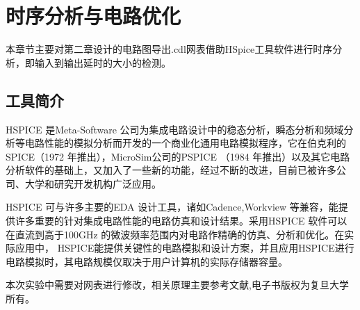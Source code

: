 \chapter{时序分析与电路优化}
本章节主要对第二章设计的电路图导出.cdl网表借助HSpice工具软件进行时序分析，即输入到输出延时的大小的检测。
\section{工具简介}
HSPICE 是Meta-Software 公司为集成电路设计中的稳态分析，瞬态分析和频域分析等电路性能的模拟分析而开发的一个商业化通用电路模拟程序，它在伯克利的SPICE（1972 年推出），MicroSim公司的PSPICE （1984 年推出）以及其它电路分析软件的基础上，又加入了一些新的功能，经过不断的改进，目前已被许多公司、大学和研究开发机构广泛应用。

HSPICE 可与许多主要的EDA 设计工具，诸如Cadence,Workview 等兼容，能提供许多重要的针对集成电路性能的电路仿真和设计结果。采用HSPICE 软件可以在直流到高于100GHz 的微波频率范围内对电路作精确的仿真、分析和优化。在实际应用中， HSPICE能提供关键性的电路模拟和设计方案，并且应用HSPICE进行电路模拟时，其电路规模仅取决于用户计算机的实际存储器容量。

本次实验中需要对网表进行修改，相关原理主要参考文献\cite{bookHSpice2007},电子书版权为复旦大学所有。

